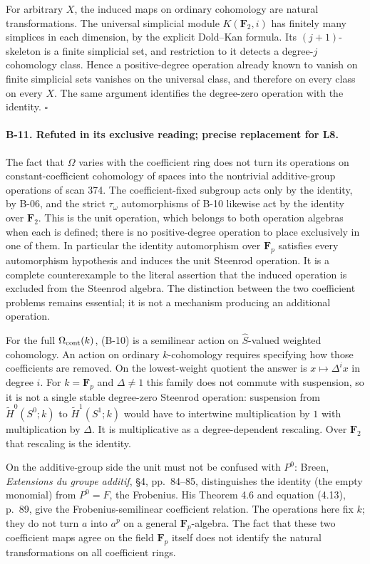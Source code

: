 For arbitrary $X$, the induced maps on ordinary cohomology are
natural transformations. The universal simplicial module
$K(\mathbf F_2,i)$ has finitely many simplices in each dimension,
by the explicit Dold--Kan formula. Its $(j+1)$-skeleton is a finite
simplicial set, and restriction to it detects a degree-$j$
cohomology class. Hence a positive-degree operation already known
to vanish on finite simplicial sets vanishes on the universal class,
and therefore on every class on every $X$. The same argument
identifies the degree-zero operation with the identity.
\hfill$\square$

\paragraph{B-11. Refuted in its exclusive reading; precise replacement for L8.}
The fact that $\Omega$ varies with the coefficient ring does not
turn its operations on constant-coefficient cohomology of spaces
into the nontrivial additive-group operations of scan 374.
The coefficient-fixed subgroup acts only by the identity, by
B-06, and the strict $\tau_\omega$ automorphisms of B-10 likewise
act by the identity over $\mathbf F_2$. This is the unit operation,
which belongs to both operation algebras when each is defined;
there is no positive-degree operation to place exclusively in one
of them. In particular the identity automorphism over $\mathbf F_p$
satisfies every automorphism hypothesis and induces the unit
Steenrod operation. It is a complete counterexample to the literal
assertion that the induced operation is excluded from the Steenrod
algebra. The distinction between the two coefficient problems
remains essential; it is not a mechanism producing an additional
operation.

For the full $\Omega_{\rm cont}(k)$, (B-10) is a semilinear action on
$\widehat S$-valued weighted cohomology. An action on ordinary
$k$-cohomology requires specifying how those coefficients are
removed. On the lowest-weight quotient the answer is
$x\mapsto\Delta^i x$ in degree $i$. For $k=\mathbf F_p$ and
$\Delta\ne1$ this family does not commute with suspension, so it
is not a single stable degree-zero Steenrod operation: suspension
from $\widetilde H^0(S^0;k)$ to $\widetilde H^1(S^1;k)$ would have
to intertwine multiplication by $1$ with multiplication by $\Delta$. It is
multiplicative as a degree-dependent rescaling. Over $\mathbf F_2$
that rescaling is the identity.

On the additive-group side the unit must not be confused with
$P^0$: Breen, \emph{Extensions du groupe additif}, \S4,
pp.~84--85, distinguishes the identity (the empty monomial) from
$P^0=F$, the Frobenius. His Theorem 4.6 and equation (4.13), p.~89,
give the Frobenius-semilinear coefficient relation. The operations
here fix $k$; they do not turn $a$ into $a^p$ on a general
$\mathbf F_p$-algebra. The fact that these two coefficient maps
agree on the field $\mathbf F_p$ itself does not identify the
natural transformations on all coefficient rings.

